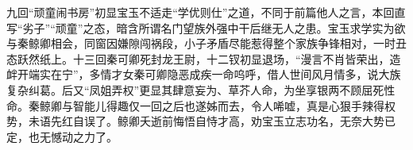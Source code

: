     \begin{solution}
        \large 九回“顽童闹书房”初显宝玉不适走“学优则仕”之道，不同于前篇他人之言，本回直写“劣子”“顽童”之态，暗含所谓名门望族外强中干后继无人之患。宝玉求学实为欲与秦鲸卿相会，同窗因嫌隙闯祸段，小子矛盾尽能惹得整个家族争锋相对，一时丑态跃然纸上。十三回秦可卿死封龙王尉，十二钗初显退场，“漫言不肖皆荣出，造衅开端实在宁”，多情才女秦可卿隐恶成疾一命呜呼，借人世间风月情多，说大族复杂纠葛。后又“凤姐弄权”更显其肆意妄为、草芥人命，为坐享银两不顾屈死性命。秦鲸卿与智能儿得趣仅一回之后也遂姊而去，令人唏嘘，真是心狠手辣得权势，未语先红自误了。鲸卿夭逝前悔悟自恃才高，劝宝玉立志功名，无奈大势已定，也无憾动之力了。
    \end{solution}












